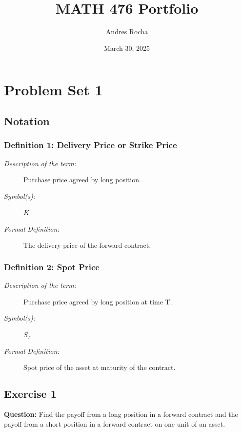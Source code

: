 \documentclass{article}
\title{MATH 476 Portfolio}
\author{Andres Rocha}
\date{March 30, 2025}
\begin{document}
\maketitle

\section{Problem Set 1}


\subsection{Notation}

\subsubsection{Definition 1: Delivery Price or Strike Price}
\begin{description}
    \item[\textit{Description of the term:}] Purchase price agreed by long position.
    \item[\textit{Symbol(s):}] $K$
    \item[\textit{Formal Definition:}] The delivery price of the forward contract.
\end{description}


\subsubsection{Definition 2: Spot Price}

\begin{description}
    \item[\textit{Description of the term:}] Purchase price agreed by long position at time T.
    \item[\textit{Symbol(s):}] $S_T$
    \item[\textit{Formal Definition:}] Spot price of the asset at maturity of the contract.
\end{description}


\subsection*{Exercise 1}

\textbf{Question:} Find the payoff from a long position in a forward contract and the payoff from a short position in a forward contract on one unit of an asset.
\end{document}
